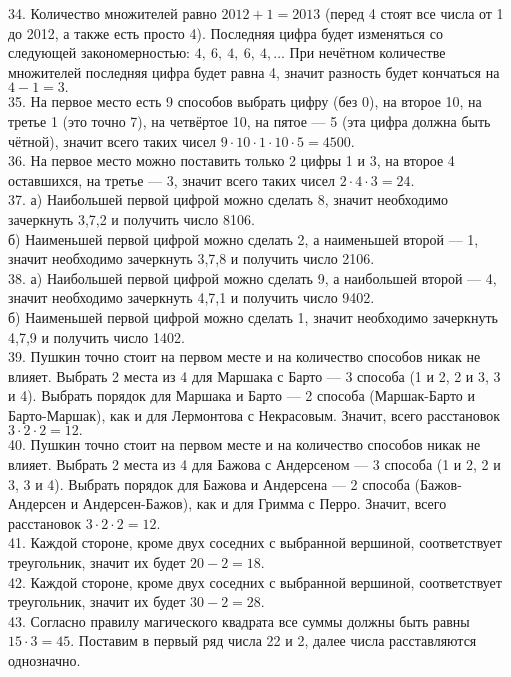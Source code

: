 34. Количество множителей равно $2012+1=2013$ (перед 4 стоят все числа от 1 до 2012, а также есть просто 4). Последняя цифра будет изменяться со следующей закономерностью: $4,\ 6,\ 4,\ 6,\ 4,\ldots$ При нечётном количестве множителей последняя цифра будет равна 4, значит разность будет кончаться на $4-1=3.$\\
35. На первое место есть 9 способов выбрать цифру (без 0), на второе 10, на третье 1 (это точно 7), на четвёртое 10, на пятое --- 5 (эта цифра должна быть чётной), значит всего таких чисел $9\cdot10\cdot1\cdot10\cdot5=4500.$\\
36. На первое место можно поставить только 2 цифры 1 и 3, на второе 4 оставшихся, на третье --- 3, значит всего таких чисел $2\cdot4\cdot3=24.$\\
37. а) Наибольшей первой цифрой можно сделать 8, значит необходимо зачеркнуть 3,7,2 и получить число 8106.\\
б) Наименьшей первой цифрой можно сделать 2, а наименьшей второй --- 1, значит необходимо зачеркнуть 3,7,8 и получить число 2106.\\
38. а) Наибольшей первой цифрой можно сделать 9, а наибольшей второй --- 4, значит необходимо зачеркнуть 4,7,1 и получить число 9402.\\
б) Наименьшей первой цифрой можно сделать 1, значит необходимо зачеркнуть 4,7,9 и получить число 1402.\\
39. Пушкин точно стоит на первом месте и на количество способов никак не влияет. Выбрать 2 места из 4 для Маршака с Барто --- 3 способа (1 и 2, 2 и 3, 3 и 4). Выбрать порядок для Маршака и Барто --- 2 способа (Маршак-Барто и Барто-Маршак), как и для  Лермонтова с Некрасовым. Значит, всего расстановок $3\cdot2\cdot2=12.$\\
40. Пушкин точно стоит на первом месте и на количество способов никак не влияет. Выбрать 2 места из 4 для Бажова с Андерсеном --- 3 способа (1 и 2, 2 и 3, 3 и 4). Выбрать порядок для Бажова и Андерсена --- 2 способа (Бажов-Андерсен и Андерсен-Бажов), как и для  Гримма с Перро. Значит, всего расстановок $3\cdot2\cdot2=12.$\\
41. Каждой стороне, кроме двух соседних с выбранной вершиной, соответствует треугольник, значит их будет $20-2=18.$\\
42. Каждой стороне, кроме двух соседних с выбранной вершиной, соответствует треугольник, значит их будет $30-2=28.$\\
43. Согласно правилу магического квадрата все суммы должны быть равны $15\cdot3=45.$ Поставим в первый ряд числа 22 и 2, далее числа расставляются однозначно.
